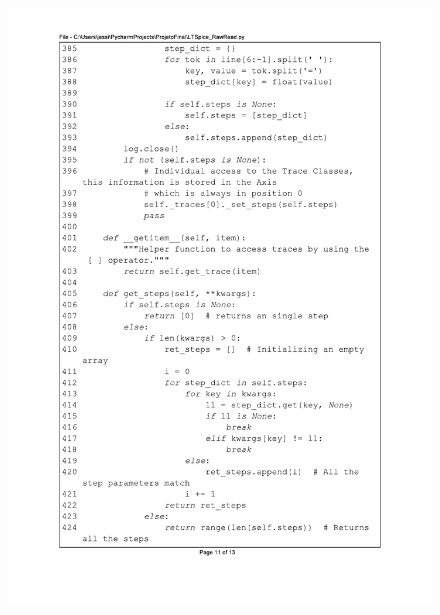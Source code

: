 \begin{figure}[]
\centering
\includegraphics[scale=0.9]{01_Pre_textuais/code/leitura11.pdf}
\end{figure}

